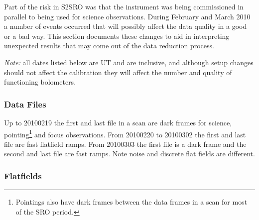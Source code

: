 \documentclass[twoside,11pt]{article}
\renewcommand{\_}{\texttt{\symbol{95}}}
\begin{document}
Part of the risk in S2SRO was that the instrument was being
commissioned in parallel to being used for science
observations. During February and March 2010 a number of events
occurred that will possibly affect the data quality in a good or a bad
way. This section documents these changes to aid in interpreting
unexpected results that may come out of the data reduction process.

\textit{Note:} all dates listed below are UT and are inclusive, and
although setup changes should not affect the calibration they will
affect the number and quality of functioning bolometers.

\subsubsection{Data Files}

Up to 20100219 the first and last file in a scan are dark frames for
science, pointing\footnote{ Pointings also have dark frames between
  the data frames in a scan for most of the SRO period.} and focus
observations. From 20100220 to 20100302 the first and last file are
fast flatfield ramps. From 20100303 the first file is a dark frame and
the second and last file are fast ramps. Note noise and discrete flat
fields are different.

\subsubsection{Flatfields}
\end{document}
